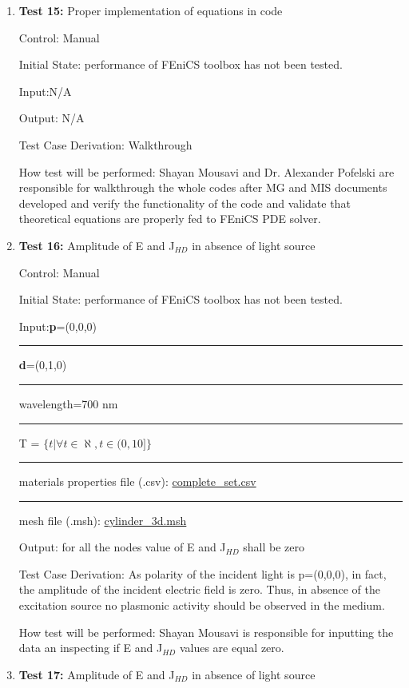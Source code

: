 \documentclass[12pt, titlepage]{article}
\begin{document}
\begin{enumerate}
	
\item{\textbf{Test 15:} Proper implementation of equations in code\\}

Control: Manual

Initial State:  performance of FEniCS toolbox has not been tested. 

Input:N/A

Output: N/A

Test Case Derivation: Walkthrough 

How test will be performed: Shayan Mousavi and Dr. Alexander Pofelski are responsible for walkthrough the whole codes after MG and MIS documents developed and verify the functionality of the code and validate that theoretical equations are properly fed to FEniCS PDE solver.

	
\item{\textbf{Test 16:} Amplitude of E and J$_{HD}$ in absence of light source\\}

Control: Manual 

Initial State:  performance of FEniCS toolbox has not been tested. 

Input:\textbf{p}=(0,0,0)\\
\rule{1.3cm}{0pt}\textbf{d}=(0,1,0)\\
\rule{1.3cm}{0pt}wavelength=700 nm\\ 
\rule{1.3cm}{0pt}T = $\{t| \forall t \in \aleph, t \in (0,10]\}$\\
\rule{1.3cm}{0pt}materials properties file (.csv): \href{https://github.com/shmouses/SPDFM/blob/master/src/TestCase/complete\_set.csv}{complete\_set.csv}\\
\rule{1.3cm}{0pt}mesh file (.msh): \href{https://github.com/shmouses/SPDFM/blob/master/src/TestCase/cylinder\_3d.msh}{cylinder\_3d.msh}

Output: for all the nodes value of E and J$_{HD}$ shall be zero 

Test Case Derivation: As polarity of the incident light is p=(0,0,0), in fact, the amplitude of the incident electric field is zero. Thus, in absence of the excitation source no plasmonic activity should be observed in the medium. 

How test will be performed: Shayan Mousavi is responsible for inputting the data an inspecting if E and J$_{HD}$ values are equal zero.  	
		
		
\item{\textbf{Test 17:} Amplitude of E and J$_{HD}$ in absence of light source\\}


\end{enumerate}
\end{document}
